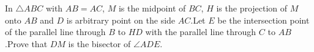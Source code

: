 In $\triangle ABC$ with $AB=AC$, $M$ is the midpoint of $BC$, $H$ is the projection of $M$ onto $AB$ and $D$ is arbitrary point on the side $AC$.Let $E$ be the intersection point of the parallel line through $B$ to $HD$ with the parallel line through $C$ to $AB$.Prove that $DM$ is the bisector of $\angle ADE$.